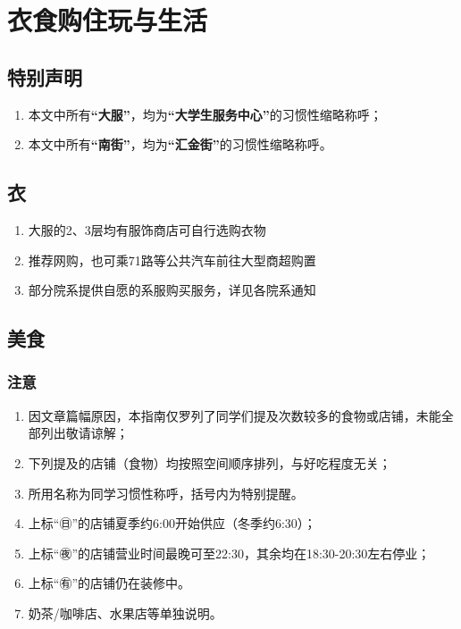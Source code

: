 \chapter[衣食购住玩与生活]{衣食购住玩与生活}

\section*{特别声明}
\begin{enumerate}
    \item 本文中所有\textbf{“大服”}，均为\textbf{“大学生服务中心”}的习惯性缩略称呼；
    \item 本文中所有\textbf{“南街”}，均为\textbf{“汇金街”}的习惯性缩略称呼。
\end{enumerate}
\section[衣]{衣}
\begin{enumerate}
    \item 大服的2、3层均有服饰商店可自行选购衣物
    \item 推荐网购，也可乘71路等公共汽车前往大型商超购置
    \item 部分院系提供自愿的系服购买服务，详见各院系通知
\end{enumerate}

\section[美食]{美食}
\subsection*{注意}
\begin{enumerate}
    \item 因文章篇幅原因，本指南仅罗列了同学们提及次数较多的食物或店铺，未能全部列出敬请谅解；
    \item 下列提及的店铺（食物）均按照空间顺序排列，与好吃程度无关；
    \item 所用名称为同学习惯性称呼，括号内为特别提醒。
    \item 上标“㊐”的店铺夏季约6:00开始供应（冬季约6:30）；
    \item 上标“㊰”的店铺营业时间最晚可至22:30，其余均在18:30-20:30左右停业；
    \item 上标“㊒”的店铺仍在装修中。
    \item 奶茶/咖啡店、水果店等单独说明。
\end{enumerate}

